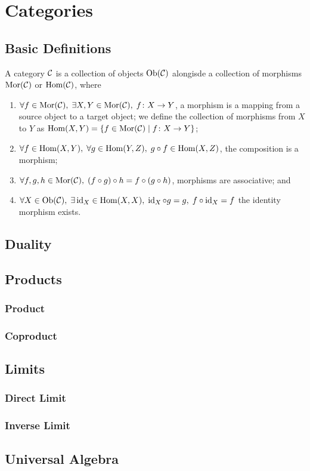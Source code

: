 \section{Categories}

\subsection{Basic Definitions}

\begin{definition}
    A category \(\mathcal{C}\) is a collection of objects \(\operatorname{Ob}(\mathcal{C})\)
    alongisde a collection of morphisms \(\operatorname{Mor}(\mathcal{C})\) or \(\operatorname{Hom}(\mathcal{C})\),
    where
    \begin{enumerate}[label={(\roman*)}, itemsep=0mm]
        \item \(\forall f \in \operatorname{Mor}(\mathcal{C}),\; \exists X,Y \in \operatorname{Mor}(\mathcal{C}),\; f\colon X\to Y\),
            a morphism is a mapping from a source object to a target object;
            we define the collection of morphisms from \(X\) to \(Y\)
            as \(\operatorname{Hom}(X,Y) = \{f\in\operatorname{Mor}(\mathcal{C}) \mid f\colon X\to Y\}\);
        \item \(\forall f \in \operatorname{Hom}(X,Y),\; \forall g \in \operatorname{Hom}(Y,Z),\; g \circ f \in \operatorname{Hom}(X,Z)\),
            the composition is a morphism;
        \item \(\forall f,g,h \in \operatorname{Mor}(\mathcal{C}),\; (f \circ g) \circ h = f \circ (g \circ h)\),
            morphisms are associative; and
        \item \(\forall X \in \operatorname{Ob}(\mathcal{C}),\; \exists \operatorname{id}_X \in \operatorname{Hom}(X,X),\; \operatorname{id}_X \circ g = g,\; f \circ \operatorname{id}_X = f\)
            the identity morphism exists.
    \end{enumerate}
\end{definition}


\subsection{Duality}


\subsection{Products}

\subsubsection*{Product}

\subsubsection*{Coproduct}


\subsection{Limits}

\subsubsection*{Direct Limit}

\subsubsection*{Inverse Limit}


\subsection{Universal Algebra}
